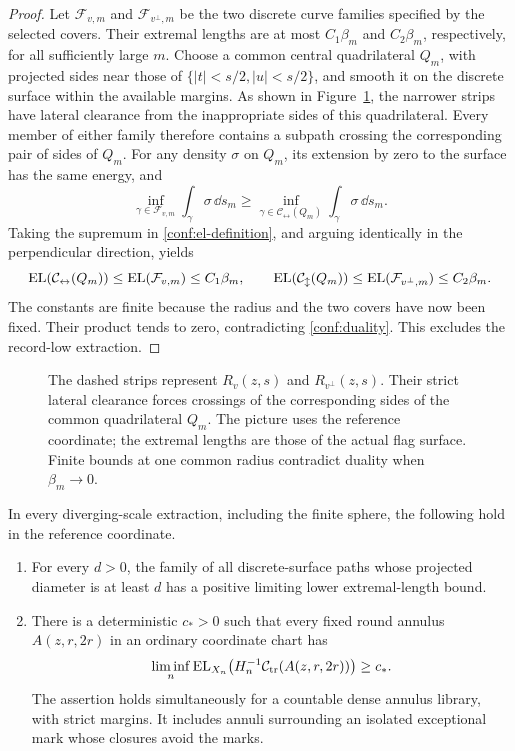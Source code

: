 \begin{proof}
Let \(\mathcal F_{v,m}\) and \(\mathcal F_{v^\perp,m}\) be the
two discrete curve families specified by the selected covers.
Their extremal lengths are at most \(C_1\beta_m\) and
\(C_2\beta_m\), respectively, for all sufficiently large \(m\).
Choose a common central quadrilateral \(Q_m\), with projected
sides near those of \(\{|t|<s/2,|u|<s/2\}\), and smooth it on
the discrete surface within the available margins.  As shown in
Figure~\ref{conf:transverse-figure}, the narrower strips have lateral
clearance from the inappropriate sides of this quadrilateral.  Every
member of either family therefore contains a subpath crossing the
corresponding pair of sides of \(Q_m\).  For any density \(\sigma\) on
\(Q_m\), its extension by zero to the surface has the same energy,
and
\[
 \inf_{\gamma\in\mathcal F_{v,m}}\int_\gamma\sigma\,\dd s_m
 \ge
 \inf_{\gamma\in\mathcal C_{\leftrightarrow}(Q_m)}
                       \int_\gamma\sigma\,\dd s_m.
\]
Taking the supremum in \eqref{conf:el-definition}, and arguing
identically in the perpendicular direction, yields
\[
 \operatorname{EL}(\mathcal C_{\leftrightarrow}(Q_m))
       \le\operatorname{EL}(\mathcal F_{v,m})\le C_1\beta_m,
 \qquad
 \operatorname{EL}(\mathcal C_{\updownarrow}(Q_m))
       \le\operatorname{EL}(\mathcal F_{v^\perp,m})\le C_2\beta_m.
\]
The constants are finite because the radius and the two covers
have now been fixed.  Their product
tends to zero, contradicting \eqref{conf:duality}.  This excludes the
record-low extraction.
\end{proof}

\begin{figure}[tb]
\centering

\caption{The dashed strips represent \(R_v(z,s)\) and
\(R_{v^\perp}(z,s)\).  Their strict lateral clearance forces
crossings of the corresponding sides of the common quadrilateral
\(Q_m\).  The picture uses the reference coordinate; the extremal lengths are those of the actual flag surface.
Finite bounds at one common radius contradict duality when
\(\beta_m\to0\).}
\label{conf:transverse-figure}
\end{figure}

\begin{proposition}
\label{conf:macroscopic-el}
In every diverging-scale extraction, including the finite sphere,
the following hold in the reference coordinate.
\begin{enumerate}
\item For every \(d>0\), the family of all discrete-surface paths
whose projected diameter is at least \(d\) has a positive limiting
lower extremal-length bound.
\item There is a deterministic \(c_*>0\) such that every fixed
round annulus \(A(z,r,2r)\) in an ordinary coordinate chart has
\[
 \liminf_n\operatorname{EL}_{X_n}\bigl(H_n^{-1}
                   \mathcal C_{\rm tr}(A(z,r,2r))\bigr)\ge c_*.
\]
The assertion holds simultaneously for a countable dense annulus
library, with strict margins.  It includes annuli surrounding an
isolated exceptional mark whose closures avoid the marks.
\end{enumerate}
\end{proposition}

